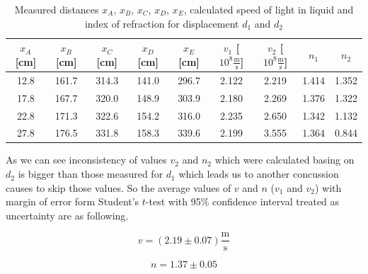 \documentclass[a4paper,12pt]{article}
\begin{document}
    \begin{table}[H]
        \begin{center}
            \caption{Measured distances $x_A$, $x_B$, $x_C$, $x_D$, $x_E$, calculated speed of light in liquid and index of refraction for displacement $d_1$ and $d_2$}
            \label{tab:vn}
            \begin{tabular}{|c|c|c|c|c|c|c|c|c|}
                \hline
                $x_A$ [cm] & $x_B$ [cm] & $x_C$ [cm] & 
                $x_D$ [cm] & $x_E$ [cm] & 
                $v_1$ [$10^8 \frac{\mathrm m}{\mathrm s}$] &
                $v_2$ [$10^8 \frac{\mathrm m}{\mathrm s}$] &
                $n_1$ & $n_2$ \\ 
                \hline
                12.8 & 161.7 & 314.3 & 141.0 & 296.7 & 2.122 & 2.219 & 1.414 & 1.352\\
                17.8 & 167.7 & 320.0 & 148.9 & 303.9 & 2.180 & 2.269 & 1.376 & 1.322\\
                22.8 & 171.3 & 322.6 & 154.2 & 316.0 & 2.235 & 2.650 & 1.342 & 1.132\\
                27.8 & 176.5 & 331.8 & 158.3 & 339.6 & 2.199 & 3.555 & 1.364 & 0.844\\
                \hline
            \end{tabular}
        \end{center}
    \end{table}

    As we can see inconsistency of values $v_2$ and $n_2$ which were calculated basing on $d_2$ is bigger than those measured for $d_1$ which leads us to another concussion causes to skip those values. So the average values of $v$ and $n$ ($v_1$ and $v_2$) with margin of error form Student's $t$-test with 95\% confidence interval treated as uncertainty are as following. 

    \begin{displaymath}
        v = (2.19 \pm 0.07) \frac{\mathrm m}{\mathrm s}
    \end{displaymath}
    
    \begin{displaymath}
        n = 1.37 \pm 0.05
    \end{displaymath}
\end{document}
